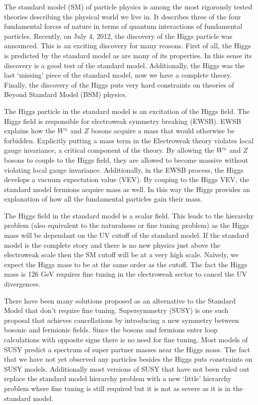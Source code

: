 
The standard model (SM) of particle physics is among the most rigorously tested theories describing the physical world we live in.
It describes three of the four fundamental forces of nature in terms of quantum interactions of fundamental particles.
Recently, on July 4, 2012, the discovery of the Higgs particle was announced.
This is an exciting discovery for many reasons.
First of all, the Higgs is predicted by the standard model as are many of its properties.
In this sense its discovery is a good test of the standard model.
Additionally, the Higgs was the last `missing' piece of the standard model, now we have a complete theory.
Finally, the discovery of the Higgs puts very hard constraints on theories of Beyond Standard Model (BSM) physics.

The Higgs particle in the standard model is an excitation of the Higgs field.
The Higgs field is responsible for electroweak symmetry breaking (EWSB).
EWSB explains how the $W^{\pm}$ and $Z$ bosons acquire a mass that would otherwise be forbidden.
Explicitly putting a mass term in the Electroweak theory violates local gauge invariance, a critical component of the theory.
By allowing the $W^{\pm}$ and $Z$ bosons to couple to the Higgs field, they are allowed to become massive without violating local gauge invariance.
Additionally, in the EWSB process, the Higgs develops a vacuum expectation value (VEV).
By couping to the Higgs VEV, the standard model fermions acquire mass as well.
In this way the Higgs provides an explanation of how all the fundamental particles gain their mass.

The Higgs field in the standard model is a scalar field.
This leads to the hierarchy problem (also equivalent to the naturalness or fine tuning problem) as the Higgs mass will be dependant on the UV cutoff of the standard model.
If the standard model is the complete story and there is no new physics just above the electroweak scale then the SM cutoff will be at a very high scale.
Naïvely, we expect the Higgs mass to be at the same order as the cutoff.
The fact the Higgs mass is 126 GeV requires fine tuning in the electroweak sector to cancel the UV divergences.

There have been many solutions proposed as an alternative to the Standard Model that don't require fine tuning.
Supersymmetry (SUSY) is one such proposal that achieves cancellations by introducing a new symmetry between bosonic and fermionic fields.
Since the bosons and fermions enter loop calculations with opposite signs there is no need for fine tuning.
Most models of SUSY predict a spectrum of super partner masses near the Higgs mass.
The fact that we have not yet observed any particles besides the Higgs puts constraints on SUSY models.
Additionally most versions of SUSY that have not been ruled out replace the standard model hierarchy problem with a new  `little' hierarchy problem where fine tuning is still required but it is not as severe as it is in the standard model.

